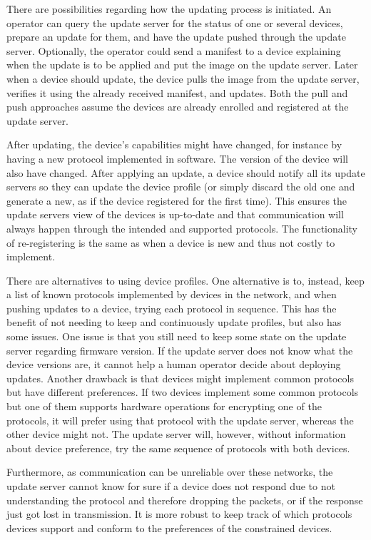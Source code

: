 \documentclass[0-thesis.tex]{subfiles}
\begin{document}
There are possibilities regarding how the updating process is initiated. An operator can
query the update server for the status of one or several devices, prepare an update for
them, and have the update pushed through the update server. Optionally, the operator could
send a manifest to a device explaining when the update is to be applied and put the image
on the update server. Later when a device should update, the device pulls the image from
the update server, verifies it using the already received manifest, and updates. Both the
pull and push approaches assume the devices are already enrolled and registered at the
update server.

After updating, the device's capabilities might have changed, for instance by having a new
protocol implemented in software. The version of the device will also have changed. After
applying an update, a device should notify all its update servers so they can update the
device profile (or simply discard the old one and generate a new, as if the device
registered for the first time). This ensures the update servers view of the devices is
up-to-date and that communication will always happen through the intended and supported
protocols. The functionality of re-registering is the same as when a device is new and
thus not costly to implement.

There are alternatives to using device profiles. One alternative is to, instead, keep a
list of known protocols implemented by devices in the network, and when pushing updates to
a device, trying each protocol in sequence. This has the benefit of not needing to keep
and continuously update profiles, but also has some issues. One issue is that you still
need to keep some state on the update server regarding firmware version. If the update
server does not know what the device versions are, it cannot help a human operator decide
about deploying updates. Another drawback is that devices might implement common protocols
but have different preferences. If two devices implement some common protocols but one of
them supports hardware operations for encrypting one of the protocols, it will prefer
using that protocol with the update server, whereas the other device might not. The update
server will, however, without information about device preference, try the same sequence of
protocols with both devices.

Furthermore, as communication can be unreliable over these networks, the update server
cannot know for sure if a device does not respond due to not understanding the protocol
and therefore dropping the packets, or if the response just got lost in transmission. It
is more robust to keep track of which protocols devices support and conform to the
preferences of the constrained devices.
\end{document}
